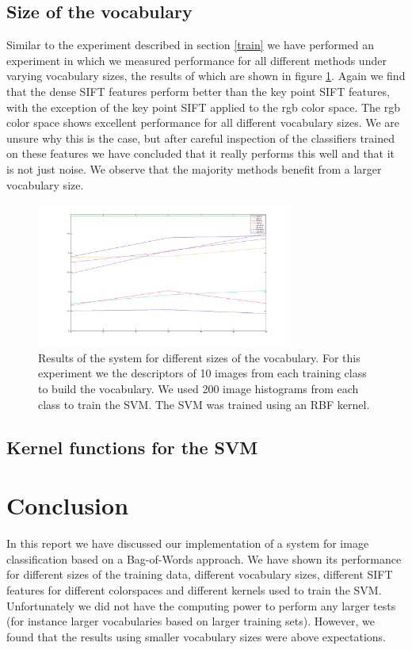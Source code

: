 \documentclass[11pt]{article}
\begin{document}
\subsection{Size of the vocabulary}
Similar to the experiment described in section \ref{train} we have performed an experiment in which we measured performance for all different methods under varying vocabulary sizes, the results of which are shown in figure \ref{vocabularySizes}. Again we find that the dense SIFT features perform better than the key point SIFT features, with the exception of the key point SIFT applied to the rgb color space. The rgb color space shows excellent performance for all different vocabulary sizes. We are unsure why this is the case, but after careful inspection of the classifiers trained on these features we have concluded that it really performs this well and that it is not just noise. We observe that the majority methods benefit from a larger vocabulary size. 
\begin{figure}[H]
  \centering
    \includegraphics[width=0.75\textwidth]{vocabularySizes}
      \caption{Results of the system for different sizes of the vocabulary. For this experiment we the descriptors of 10 images from each training class to build the vocabulary. We used 200 image histograms from each class to train the SVM. The SVM was trained using an RBF kernel.}
      \label{vocabularySizes}
\end{figure}

\subsection{Kernel functions for the SVM}

\section{Conclusion}
In this report we have discussed our implementation of a system for image classification based on a Bag-of-Words approach. We have shown its performance for different sizes of the training data, different vocabulary sizes, different SIFT features for different colorspaces and different kernels used to train the SVM. Unfortunately we did not have the computing power to perform any larger tests (for instance larger vocabularies based on larger training sets). However, we found that the results using smaller vocabulary sizes were above expectations. 
\end{document}
